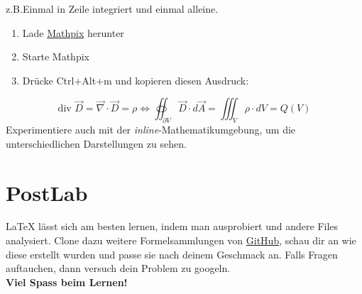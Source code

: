 	\begin{aufgabe}
	z.B.Einmal in Zeile integriert und einmal alleine. 
	\end{aufgabe}

	\begin{aufgabe}
	\begin{enumerate}
		\item Lade \href{https://mathpix.com}{Mathpix} herunter
		\item Starte Mathpix
		\item Drücke Ctrl+Alt+m und kopieren diesen Ausdruck:
	\end{enumerate}

	\[ \text{div } \vec{D} = \vec{\nabla} \cdot \vec{D} = \rho \Leftrightarrow \oiint_{\partial V}\vec{D}\cdot d\vec{A} = \iiint_V \rho \cdot dV = Q(V) \]
	Experimentiere auch mit der \textit{inline}-Mathematikumgebung, um die unterschiedlichen Darstellungen zu sehen. 
	\end{aufgabe}
	



\section{PostLab}

	\begin{aufgabe}[Ausprobieren!]
	\LaTeX{} lässt sich am besten lernen, indem man ausprobiert und andere Files analysiert. Clone dazu weitere Formelsammlungen von {\color{blue}\href{https://github.com/HSR-Stud/VorlageZFLaTex}{GitHub}}, schau dir an wie diese erstellt wurden und passe sie nach deinem Geschmack an. Falls Fragen auftauchen, dann versuch dein Problem zu googeln.\vspace{6pt}\\
	\textbf{\large Viel Spass beim Lernen! %
	}
\end{aufgabe}